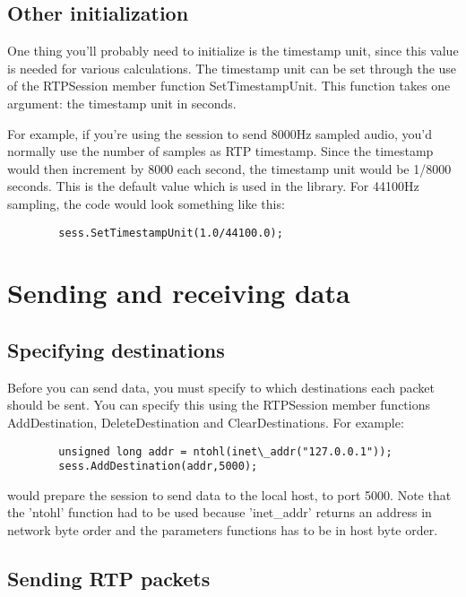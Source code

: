 \subsection{Other initialization}

One thing you'll probably need to initialize is the timestamp unit, since this
value is needed for various calculations. The timestamp unit can be set through
the use of the RTPSession member function SetTimestampUnit. This function takes
one argument: the timestamp unit in seconds.
    
    
    For example, if you're using the session to send 8000Hz sampled audio,
you'd normally use the number of samples as RTP timestamp. Since the timestamp
would then increment by 8000 each second, the timestamp unit would be 1/8000
seconds. This is the default value which is used in the library. For 44100Hz
sampling, the code would look something like this:
        \begin{verbatim}
        sess.SetTimestampUnit(1.0/44100.0);
        \end{verbatim}
        
\section{Sending and receiving data}

\subsection{Specifying destinations}

Before you can send data, you must specify to which destinations each packet
should be sent. You can specify this using the RTPSession member functions
AddDestination, DeleteDestination and ClearDestinations. For example:
        \begin{verbatim}
        unsigned long addr = ntohl(inet\_addr("127.0.0.1"));
        sess.AddDestination(addr,5000);
        \end{verbatim}

would prepare the session to send data to the local host, to port 5000. Note
that the 'ntohl' function had to be used because 'inet\_addr' returns an
address in network byte order and the parameters functions has to be in host
byte order.

\subsection{Sending RTP packets}

